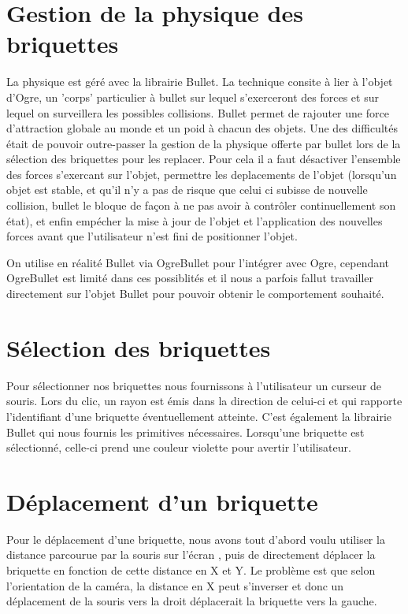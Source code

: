 \documentclass[frenchb,twoside]{EPURapport}
\begin{document}
    \section{Gestion de la physique des briquettes}
        La physique est géré avec la librairie Bullet. La technique consite à
        lier à l'objet d'Ogre, un 'corps' particulier à bullet sur lequel
        s'exerceront des forces et sur lequel on surveillera les possibles
        collisions. Bullet permet de rajouter une force d'attraction globale au
        monde et un poid à chacun des objets. Une des difficultés était de
        pouvoir outre-passer la gestion de la physique offerte par bullet lors
        de la sélection des briquettes pour les replacer. Pour cela il a faut
        désactiver l'ensemble des forces s'exercant sur l'objet, permettre les
        deplacements de l'objet (lorsqu'un objet est stable, et qu'il n'y a pas
        de risque que celui ci subisse de nouvelle collision, bullet le bloque
        de façon à ne pas avoir à contrôler continuellement son état), et enfin
        empécher la mise à jour de l'objet et l'application des nouvelles
        forces avant que l'utilisateur n'est fini de positionner l'objet. 

        On utilise en réalité Bullet via OgreBullet pour l'intégrer avec Ogre,
        cependant OgreBullet est limité dans ces possiblités et il nous a
        parfois fallut travailler directement sur l'objet Bullet pour pouvoir
        obtenir le comportement souhaité. 

    \section{Sélection des briquettes}
        Pour sélectionner nos briquettes nous fournissons à l'utilisateur un
        curseur de souris. Lors du clic, un rayon est émis dans la direction de
        celui-ci et qui rapporte l'identifiant d'une briquette éventuellement
        atteinte. C'est également la librairie Bullet qui nous fournis les
        primitives nécessaires. Lorsqu'une briquette est sélectionné, celle-ci
        prend une couleur violette pour avertir l'utilisateur.
        
    \section{Déplacement d'un briquette}
        Pour le déplacement d'une briquette, nous avons tout d'abord voulu
         utiliser la distance parcourue par la souris sur l'écran
        , puis de directement déplacer la briquette en fonction de cette distance en X et Y.
        Le problème est que selon l'orientation de la caméra, la distance en X
        peut s'inverser et donc un déplacement de la souris vers la droit
        déplacerait la briquette vers la gauche.
        
\end{document}
